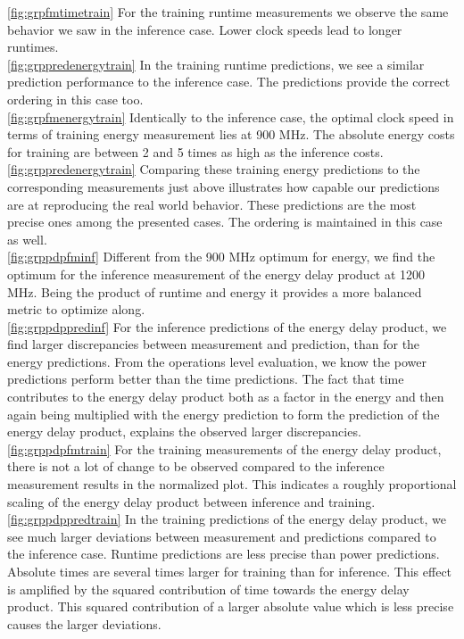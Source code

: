 \ref{fig:grpfmtimetrain} For the training runtime measurements we observe the same behavior we saw in the inference case. Lower clock speeds lead to longer runtimes.\\
\ref{fig:grppredenergytrain} In the training runtime predictions, we see a similar prediction performance to the inference case. The predictions provide the correct ordering in this case too.\\
\ref{fig:grpfmenergytrain} Identically to the inference case, the optimal clock speed in terms of training energy measurement lies at 900 MHz. The absolute energy costs for training are between 2 and 5 times as high as the inference costs. \\
\ref{fig:grppredenergytrain} Comparing these training energy predictions to the corresponding measurements just above illustrates how capable our predictions are at reproducing the real world behavior. These predictions are the most precise ones among the presented cases. The ordering is maintained in this case as well.\\
\ref{fig:grppdpfminf} Different from the 900 MHz optimum for energy, we find the optimum for the inference measurement of the energy delay product at 1200 MHz. Being the product of runtime and energy it provides a more balanced metric to optimize along. \\
\ref{fig:grppdppredinf} For the inference predictions of the energy delay product, we find larger discrepancies between measurement and prediction, than for the energy predictions. From the operations level evaluation, we know the power predictions perform better than the time predictions. The fact that time contributes to the energy delay product both as a factor in the energy and then again being multiplied with the energy prediction to form the prediction of the energy delay product, explains the observed larger discrepancies. \\
\ref{fig:grppdpfmtrain} For the training measurements of the energy delay product, there is not a lot of change to be observed compared to the inference measurement results in the normalized plot. This indicates a roughly proportional scaling of the energy delay product between inference and training. \\
\ref{fig:grppdppredtrain} In the training predictions of the energy delay product, we see much larger deviations between measurement and predictions compared to the inference case. Runtime predictions are less precise than power predictions. Absolute times are several times larger for training than for inference. This effect is amplified by the squared contribution of time towards the energy delay product. This squared contribution of a larger absolute value which is less precise causes the larger deviations.



